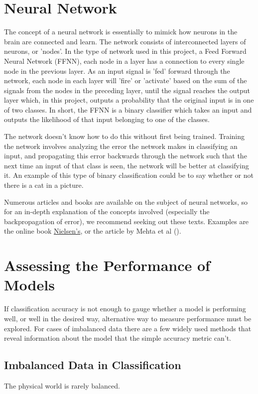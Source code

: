 \section{Neural Network}
The concept of a neural network is essentially to mimick how neurons in the
brain are connected and learn. The network consists of interconnected layers
of neurons, or 'nodes'. In the type of network used in this project, a
Feed Forward Neural Network (FFNN), each node in a layer has a connection to
every single node in the previous layer. As an input signal is 'fed' forward
through the network, each node in each layer will 'fire' or 'activate'
based on the sum of the signals from the nodes in the preceding layer, until
the signal reaches the output layer which, in this project, outputs a
probability that the original input is in one of two classes.
In short, the FFNN is a binary classifier which takes an input and outputs
the likelihood of that input belonging to one of the classes.

The network doesn't know how to do this without first being trained.
Training the network involves analyzing the error the network makes in
classifying an input, and propagating this error backwards through the network
such that the next time an input of that class is seen, the network will be
better at classifying it.
An example of this type of binary classification could be to say whether or
not there is a cat in a picture.

Numerous articles and books are available on the subject of neural networks,
so for an in-depth explanation of the concepts involved (especially the
backpropagation of error), we recommend seeking out these texts.
Examples are the online book \href{http://neuralnetworksanddeeplearning.com/}{Nielsen's}, or the article by Mehta et al (\cite{Mehta2019}).

\section{Assessing the Performance of Models}
If classification accuracy is not enough to gauge whether a model is
performing well, or well in the desired way, alternative way to measure
performance must be explored. For cases of imbalanced data there are a few
widely used methods that reveal information about the model that the simple
accuracy metric can't.

\subsection{Imbalanced Data in Classification}
The physical world is rarely balanced.

